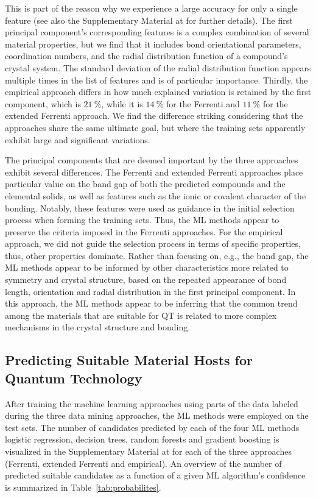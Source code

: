 \documentclass[superscriptaddress,unsortedaddress,
 amsmath,amssymb,
 aps,
]{revtex4-2}
\begin{document}
This is part of the reason why we experience a large accuracy for only a single feature (see also the Supplementary Material at \cite{supplementary} for further details). The first principal component's corresponding features is a complex combination of several material properties, but we find that it includes bond orientational parameters, coordination numbers, and the radial distribution function of a compound's crystal system. 
The standard deviation of the radial distribution function appears multiple times in the list of features and is of particular importance. 
Thirdly, the empirical approach differs in how much explained variation is retained by the first component, which is $21 \ \%$, while it is $14 \ \%$ for the Ferrenti  and $11 \ \%$ for the extended Ferrenti approach. We find the difference striking considering that the approaches share the same ultimate goal, but where the training sets apparently exhibit large and significant variations. 

The principal components that are deemed important by the three approaches exhibit several differences. The Ferrenti and extended Ferrenti approaches place particular value on the band gap of both the predicted compounds and the elemental solids, as well as features such as the ionic or covalent character of the bonding. Notably, these features were used as guidance in the initial selection process when forming the training sets. Thus, the ML methods appear to preserve the criteria imposed in the Ferrenti approaches. For the empirical approach, we did not guide the selection process in terms of specific properties, thus, other properties dominate. Rather than focusing on, e.g., the band gap, the ML methods appear to be informed by other characteristics more related to symmetry and crystal structure, based on the repeated appearance of bond length, orientation and radial distribution in the first principal component. In this approach, the ML methods appear to be inferring that the common trend among the materials that are suitable for QT is related to more complex mechanisms in the crystal structure and bonding. 

\subsection*{Predicting Suitable Material Hosts for Quantum Technology} 
After training the machine learning approaches using parts of the data labeled during the three data mining approaches, the ML methods were employed on the test sets. 
The number of candidates predicted by each of the four ML methods logistic regression, decision trees, random forests and gradient boosting is visualized in the Supplementary Material at \cite{supplementary} for each of the three approaches (Ferrenti, extended Ferrenti and empirical). 
An overview of the number of predicted suitable candidates as a function of a given ML algorithm's confidence is summarized in Table~\ref{tab:probabilites}. 
\end{document}
